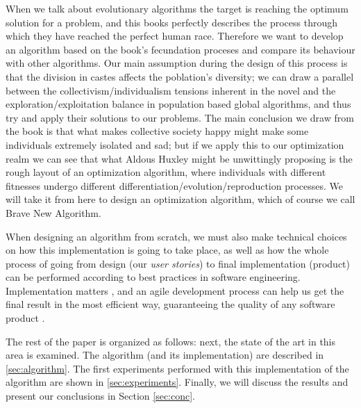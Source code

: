 When we talk about evolutionary algorithms the target is reaching the
optimum solution for a problem, and this books perfectly describes
the process through which they have reached the perfect human
race. Therefore we want to develop an algorithm based on the book's
fecundation proceses and compare its behaviour with other
algorithms. Our main assumption during the design of this process is
that the division in castes affects the
poblation's diversity; we can draw a parallel between the
collectivism/individualism tensions inherent in the novel and the
exploration/exploitation balance in population based global
algorithms, and thus try and apply their solutions to our
problems. The main conclusion we draw from the book is that what makes
collective society happy might make some individuals extremely
isolated and sad; but if we apply this to our optimization realm we
can see that what Aldous Huxley might be unwittingly proposing is the
rough layout of an optimization algorithm, where individuals with 
different fitnesses undergo different
differentiation/evolution/reproduction processes. We will take it from
here to design an optimization algorithm, which of course we call Brave
New Algorithm.

When designing an algorithm from scratch, we must also make technical
choices on how this implementation is going to take place, as well as
how the whole process of going from design (our {\em user stories}) to
final implementation (product) can be performed according to best
practices in software engineering. Implementation matters
\cite{merelo2011implementation}, and an agile development process can
help us get the final result in the most efficient way, guaranteeing
the quality of any software product \cite{agile_manifesto}.

The rest of the paper is organized as follows: next, the state of the
art in this area is examined. The algorithm (and its implementation)
are described in \ref{sec:algorithm}. The first experiments performed
with this implementation of the algorithm are shown in
\ref{sec:experiments}. Finally, we will discuss the results and
present our conclusions in Section \ref{sec:conc}.